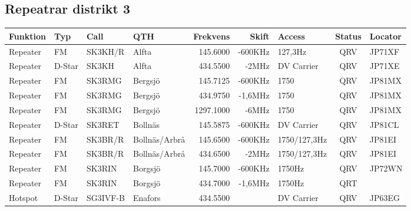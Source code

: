 \begin{landscape}
\subsection{Repeatrar distrikt 3}
\footnotesize
\begin{longtable}{llllrrlcl}
	\textbf{Funktion} & \textbf{Typ} & \textbf{Call} & \textbf{QTH}     & \textbf{Frekvens} & \textbf{Skift} & \textbf{Access} & \textbf{Status} & \textbf{Locator} \\ \hline
	\endhead
	Repeater          & FM           & SK3KH/R       & Alfta            &          145.6000 &        -600KHz & 127,3Hz         &       QRV       & JP71XF           \\
	Repeater          & D-Star       & SK3KH         & Alfta            &          434.5500 &          -2MHz & DV Carrier      &       QRV       & JP71XE           \\
	Repeater          & FM           & SK3RMG        & Bergsjö          &          145.7125 &        -600KHz & 1750            &       QRV       & JP81MX           \\
	Repeater          & FM           & SK3RMG        & Bergsjö          &          434.9750 &        -1,6MHz & 1750            &       QRV       & JP81MX           \\
	Repeater          & FM           & SK3RMG        & Bergsjö          &         1297.1000 &          -6MHz & 1750            &       QRV       & JP81MX           \\
	Repeater          & D-Star       & SK3RET        & Bollnäs          &          145.5875 &        -600KHz & DV Carrier      &       QRV       & JP81CL           \\
	Repeater          & FM           & SK3BR/R       & Bollnäs/Arbrå    &          145.6500 &        -600KHz & 1750/127,3Hz    &       QRV       & JP81EI           \\
	Repeater          & FM           & SK3BR/R       & Bollnäs/Arbrå    &          434.6500 &          -2MHz & 1750/127,3Hz    &       QRV       & JP81EI           \\
	Repeater          & FM           & SK3RIN        & Borgsjö          &          145.7000 &        -600KHz & 1750Hz          &       QRV       & JP72WN           \\
	Repeater          & FM           & SK3RIN        & Borgsjö          &          434.7000 &        -1,6MHz & 1750Hz          &       QRT       &  \\
	Hotspot           & D-Star       & SG3IVF-B      & Enafors          &          434.5500 &                & DV Carrier      &       QRV       & JP63EG           \\

\end{longtable}
\end{landscape}
